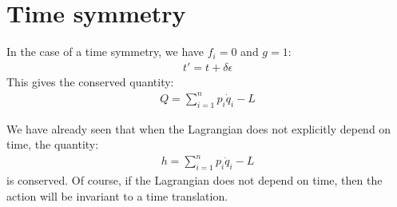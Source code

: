 \section{Time symmetry}
In the case of a time symmetry, we have $f_i=0$ and $g=1$:
\begin{align}
t'=t+\delta \epsilon
\end{align}
This gives the conserved quantity:
\begin{align}
Q=\sum_{i=1}^np_i\dot{q}_i-L
\end{align}

We have already seen that when the Lagrangian does not explicitly depend on time, the quantity:
\begin{align}
h=\sum_{i=1}^np_i\dot{q}_i-L
\end{align}
is conserved. Of course, if the Lagrangian does not depend on time, then the action will be invariant to a time translation.

